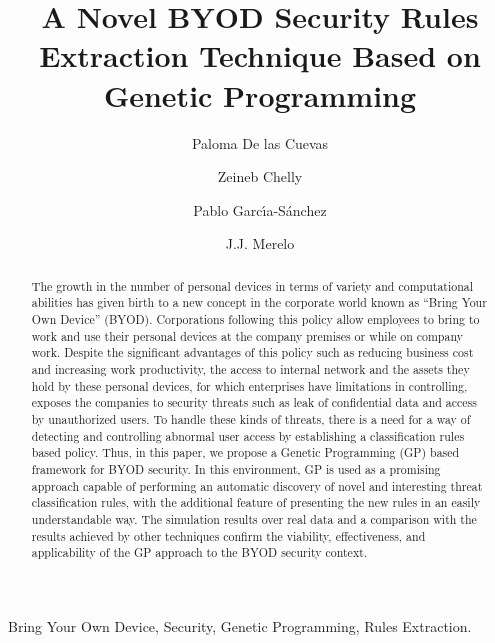 \documentclass[a4paper,10pt,twocolumn,preprint,3p]{elsarticle}
\begin{document}
\begin{frontmatter}

\title{A Novel BYOD Security Rules Extraction Technique Based on Genetic Programming}

\author[ugr]{Paloma De las Cuevas}
\author[isgt]{Zeineb Chelly}
\author[ugr]{Pablo Garc\'{\i}a-S\'anchez}
\author[ugr]{J.J. Merelo}

\address[ugr]{Department of Computer Architecture and Computer Technology, ETSIIT and CITIC \\
University of Granada, Granada, Spain. Tel: +34958241778. Fax: +34958248993}
\address[isgt]{LARODEC, Institut Sup\'erieur de Gestion de Tunis, Tunisia.}


\begin{abstract}
The growth in the number of personal devices in terms of variety and computational
abilities has given birth to a 
new concept in the corporate world
known as ``Bring Your Own Device'' (BYOD).
Corporations following this policy allow 
employees to bring to work and use their personal devices at
the company premises or while on company work. Despite the  significant advantages of this policy such as reducing
business cost and increasing work productivity, the access to internal network and the assets they hold by these personal devices, for which
enterprises have limitations in controlling, exposes the companies to
security threats such as leak of confidential data and access by
unauthorized users. %
To handle these kinds of threats, there
is a need for a way of detecting and controlling abnormal user
access by establishing a classification rules based policy. Thus, in
this paper, we propose a Genetic Programming (GP) based framework for
BYOD security. In this environment, GP is used as a promising approach
capable of performing an automatic discovery of novel and interesting
threat classification rules, with the additional feature of presenting the new rules in an easily understandable way.
The simulation results over real data and a
comparison with the results achieved by other techniques confirm the
viability, effectiveness, and applicability of the GP approach to the
BYOD security context.
\end{abstract}


\begin{keyword}
Bring Your Own Device, Security, Genetic Programming, Rules Extraction. 
\end{keyword}

\end{frontmatter}
\end{document}
